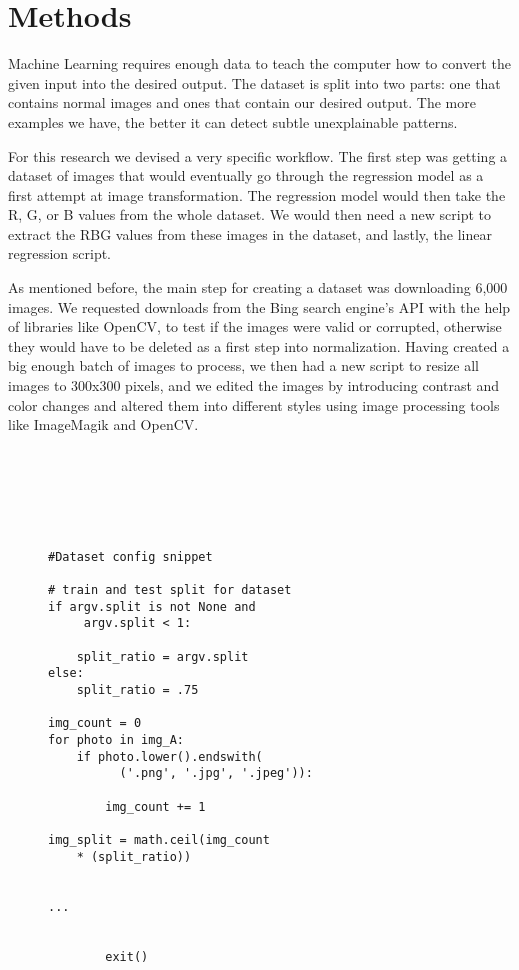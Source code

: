 \documentclass[conference]{IEEEtran}
\begin{document}
\section{Methods}\label{section:Methods}
Machine Learning requires enough data to teach the computer how to convert the given input into the desired output. The dataset is split into two parts: one that contains normal images and ones that contain our desired output. The more examples we have, the better it can detect subtle unexplainable patterns.

For this research we devised a very specific workflow. The first step was getting a dataset of images that would eventually go through the regression model as a first attempt at image transformation. The regression model would then take the R, G, or B values from the whole dataset. We would then need a new script to extract the RBG values from these images in the dataset, and lastly, the linear regression script.

As mentioned before, the main step for creating a dataset was downloading 6,000 images. We requested downloads from the Bing search engine's API with the help of libraries like OpenCV, to test if the images were valid or corrupted, otherwise they would have to be deleted as a first step into normalization. 
Having created a big enough batch of images to process, we then had a new script to resize all images to 300x300 pixels, and we edited the images by introducing contrast and color changes and altered them into different styles using image processing tools like ImageMagik and OpenCV. 




\begin{figure}[htb!]
\begin{verbatim}






#Dataset config snippet

# train and test split for dataset
if argv.split is not None and
	 argv.split < 1:
	 
    split_ratio = argv.split
else:
    split_ratio = .75

img_count = 0
for photo in img_A:
    if photo.lower().endswith(
    	  ('.png', '.jpg', '.jpeg')):
		
        img_count += 1

img_split = math.ceil(img_count 
	* (split_ratio))


...


        exit()









\end{verbatim}
\end{figure}
\end{document}

